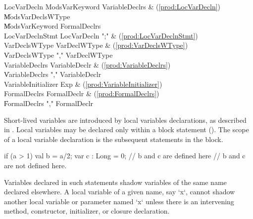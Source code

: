 \begin{bbgrammar}
         LocVarDecln \: Mods\opt VarKeyword VariableDeclrs & (\ref{prod:LocVarDecln}) \\
                     \| Mods\opt VarDeclsWType \\
                     \| Mods\opt VarKeyword FormalDeclrs \\
     LocVarDeclnStmt \: LocVarDecln \xcd";" & (\ref{prod:LocVarDeclnStmt}) \\
       VarDeclsWType \: VarDeclWType & (\ref{prod:VarDeclsWType}) \\
                     \| VarDeclsWType \xcd"," VarDeclWType \\
      VariableDeclrs \: VariableDeclr & (\ref{prod:VariableDeclrs}) \\
                     \| VariableDeclrs \xcd"," VariableDeclr \\
 VariableInitializer \: Exp & (\ref{prod:VariableInitializer}) \\
        FormalDeclrs \: FormalDeclr & (\ref{prod:FormalDeclrs}) \\
                     \| FormalDeclrs \xcd"," FormalDeclr \\
\end{bbgrammar}

Short-lived variables are introduced by local variables declarations, as
described in . Local variables may be declared only
within a block statement (). The scope of a local variable
declaration is the subsequent statements in the
block.   
\begin{xten}
  if (a > 1) {
     val b = a/2;
     var c : Long = 0;
     // b and c are defined here
  }
  // b and c are not defined here.
\end{xten}

Variables declared in such statements shadow variables of the same
name declared elsewhere.
A local variable of a given name, say \xcd`x`, cannot shadow another local
variable or parameter named \xcd`x` unless there is an intervening method,
constructor, initializer, or
closure declaration.

